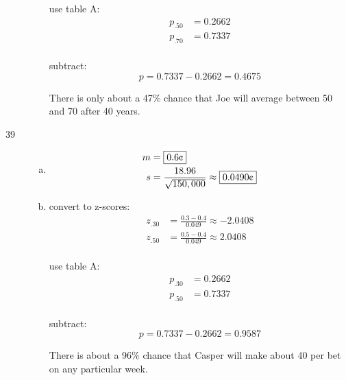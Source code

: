 \documentclass[letterpaper]{exam}
\newcommand{\cent}{\textcent\xspace}
\begin{document}
\begin{description}
\begin{enumerate}[(a)]
            use table A:
            \begin{align*}
              p_{.50} &= 0.2662 \\
              p_{.70} &= 0.7337 \\
            \end{align*}

            subtract:
            \[
              p = 0.7337 - 0.2662 = \boxed{ 0.4675 }
            \]

            There is only about a 47\% chance that Joe will average between
            50\cent and 70\cent after 40 years.

        \end{enumerate}

      \item[39]
        \begin{enumerate}[(a)]
          \item 
            \begin{align*}
              m &= \boxed{ 0.6 \text{\cent} } \\
              s &= \frac{18.96}{\sqrt{150,000}} \approx 
                \boxed{ 0.0490 \text{\cent}} \\
            \end{align*}
            
          \item
            convert to z-scores:
            \begin{align*}
              z_{.30} &= \frac{0.3 - 0.4}{0.049} \approx -2.0408 \\ 
              z_{.50} &= \frac{0.5 - 0.4}{0.049} \approx 2.0408 \\
            \end{align*}

            use table A:
            \begin{align*}
              p_{.30} &= 0.2662 \\
              p_{.50} &= 0.7337 \\
            \end{align*}

            subtract:
            \[
              p = 0.7337 - 0.2662 = \boxed{ 0.9587 }
            \]

            There is about a 96\% chance that Casper will make about 40\cent per
            bet on any particular week.

        \end{enumerate}


\end{description}
\end{document}
